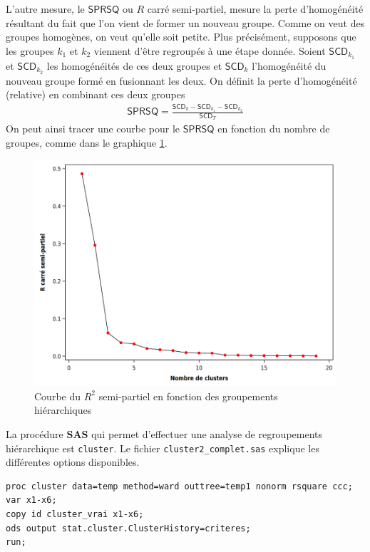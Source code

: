 \documentclass[
  11pt,
  letterpaper,
]{book}
\theoremstyle{definition}
\theoremstyle{definition}
\theoremstyle{definition}
\theoremstyle{remark}
\begin{document}
L'autre mesure, le \(\mathsf{SPRSQ}\) ou \(R\) carré semi-partiel, mesure la perte d'homogénéité résultant du fait que l'on vient de former un nouveau groupe. Comme on veut des groupes homogènes, on veut qu'elle soit petite. Plus précisément, supposons que les groupes \(k_1\) et \(k_2\) viennent d'être regroupés à une étape donnée. Soient \(\mathsf{SCD}_{k_1}\) et \(\mathsf{SCD}_{k_2}\) les homogénéités de ces deux groupes et \(\mathsf{SCD}_{k}\) l'homogénéité du nouveau groupe formé en fusionnant les deux.
On définit la perte d'homogénéité (relative) en combinant ces deux groupes
\begin{align*}
\mathsf{SPRSQ} = \frac{\mathsf{SCD}_k - \mathsf{SCD}_{k_1} - \mathsf{SCD}_{k_2}}{\mathsf{SCD}_T}
\end{align*}
On peut ainsi tracer une courbe pour le \(\mathsf{SPRSQ}\) en fonction du nombre de groupes, comme dans le graphique \ref{fig:fig4-e5}.

\begin{figure}

{\centering \includegraphics[width=0.8\linewidth]{figures/04-clustering-e5} 

}

\caption{Courbe du $R^2$ semi-partiel en fonction des groupements hiérarchiques}\label{fig:fig4-e5}
\end{figure}

La procédure \textbf{SAS} qui permet d'effectuer une analyse de regroupements hiérarchique est \texttt{cluster}. Le fichier \texttt{cluster2\_complet.sas} explique les différentes options disponibles.

\begin{verbatim}
proc cluster data=temp method=ward outtree=temp1 nonorm rsquare ccc;
var x1-x6;
copy id cluster_vrai x1-x6;
ods output stat.cluster.ClusterHistory=criteres;
run;
\end{verbatim}
\end{document}
